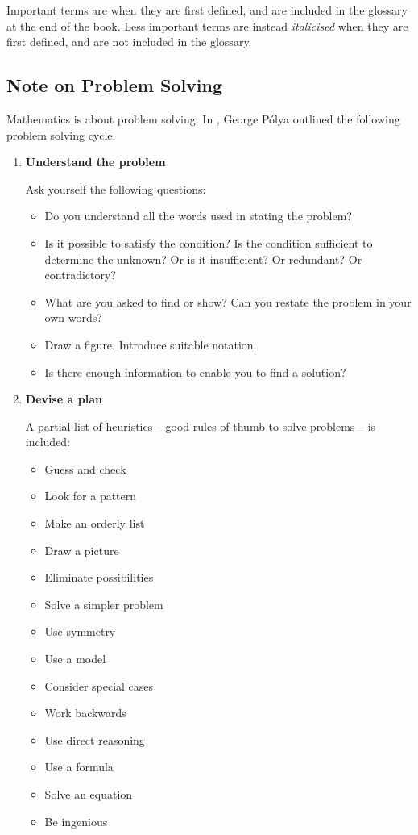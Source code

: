 Important terms are  when they are first defined, and are included in the glossary at the end of the book. Less important terms are instead \emph{italicised} when they are first defined, and are not included in the glossary.

\subsection*{Note on Problem Solving}
Mathematics is about problem solving. In \cite{polya}, George P\'{o}lya outlined the following problem solving cycle.
\begin{enumerate}
\item \textbf{Understand the problem}

Ask yourself the following questions:
\begin{itemize}
\item Do you understand all the words used in stating the problem?
\item Is it possible to satisfy the condition? Is the condition sufficient to determine the unknown? Or is it insufficient? Or redundant? Or contradictory?
\item What are you asked to find or show? Can you restate the problem in your own words?
\item Draw a figure. Introduce suitable notation.
\item Is there enough information to enable you to find a solution?
\end{itemize}

\item \textbf{Devise a plan}

A partial list of heuristics -- good rules of thumb to solve problems -- is included:
\begin{multicols}{2}
\begin{itemize}
\item Guess and check
\item Look for a pattern
\item Make an orderly list
\item Draw a picture
\item Eliminate possibilities
\item Solve a simpler problem
\item Use symmetry
\item Use a model
\item Consider special cases
\item Work backwards
\item Use direct reasoning
\item Use a formula
\item Solve an equation
\item Be ingenious
\end{itemize}
\end{multicols}


\end{enumerate}
